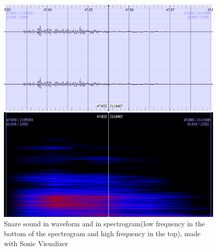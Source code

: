 \begin{figure}[H]
	\begin{center}
		\includegraphics[scale = 0.5]{fig/Snare-close-up-with-spectrogram.png}
		\caption{Snare sound in waveform and in spectrogram(low frequency in the bottom of the spectrogram and high frequency in the top), made with Sonic Visualizer}
		\label{snareClose}
	\end{center}
\end{figure}

